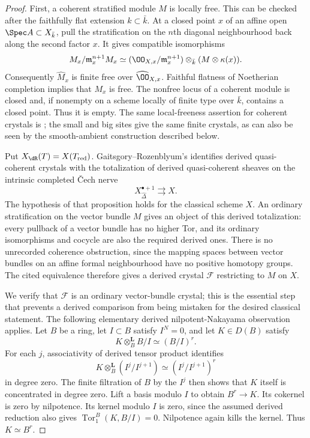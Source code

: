 \begin{proof}
First, a coherent stratified module $M$ is locally free.  This can be checked after the faithfully flat extension $k\subset\bar k$.  At a closed point $x$ of an affine open $\Spec A\subset X_{\bar k}$, pull the stratification on the $n$th diagonal neighbourhood back along the second factor $x$.  It gives compatible isomorphisms
\[
 M_x/\mathfrak m_x^{n+1}M_x
  \simeq (\OO_{X,x}/\mathfrak m_x^{n+1})
                  \otimes_{\bar k}(M\otimes\kappa(x)).
\]
Consequently $\widehat M_x$ is finite free over $\widehat{\OO}_{X,x}$.  Faithful flatness of Noetherian completion implies that $M_x$ is free.  The nonfree locus of a coherent module is closed and, if nonempty on a scheme locally of finite type over $\bar k$, contains a closed point.  Thus it is empty.  The same local-freeness assertion for coherent crystals is \cite[Theorem~6.8(4), with Axiom~A of~5.2]{ToniniZhang2019}; the small and big sites give the same finite crystals, as can also be seen by the smooth-ambient construction described below.

Put $X_{\dR}(T)=X(T_{\rm red})$.  Gaitsgory--Rozenblyum's \cite[Proposition~3.4.3]{GaitsgoryRozenblyum2014} identifies derived quasi-coherent crystals with the totalization of derived quasi-coherent sheaves on the intrinsic completed \v Cech nerve
\[
             X^{\bullet+1}_{\widehat\Delta}
                      \rightrightarrows X .
\]
The hypothesis of that proposition holds for the classical scheme $X$.  An ordinary stratification on the vector bundle $M$ gives an object of this derived totalization: every pullback of a vector bundle has no higher Tor, and its ordinary isomorphisms and cocycle are also the required derived ones.  There is no unrecorded coherence obstruction, since the mapping spaces between vector bundles on an affine formal neighbourhood have no positive homotopy groups.  The cited equivalence therefore gives a derived crystal $\mathcal F$ restricting to $M$ on $X$.

We verify that $\mathcal F$ is an ordinary vector-bundle crystal; this is the essential step that prevents a derived comparison from being mistaken for the desired classical statement.  The following elementary derived nilpotent-Nakayama observation applies.  Let $B$ be a ring, let $I\subset B$ satisfy $I^N=0$, and let $K\in D(B)$ satisfy
\[
                        K\otimes_B^{\mathbf L}B/I\simeq(B/I)^r.
\]
For each $j$, associativity of derived tensor product identifies
\[
 K\otimes_B^{\mathbf L}(I^j/I^{j+1})
      \simeq (I^j/I^{j+1})^r
\]
in degree zero.  The finite filtration of $B$ by the $I^j$ then shows that $K$ itself is concentrated in degree zero.  Lift a basis modulo $I$ to obtain $B^r\to K$.  Its cokernel is zero by nilpotence.  Its kernel modulo $I$ is zero, since the assumed derived reduction also gives $\operatorname{Tor}_1^B(K,B/I)=0$.  Nilpotence again kills the kernel.  Thus $K\simeq B^r$.


\end{proof}
